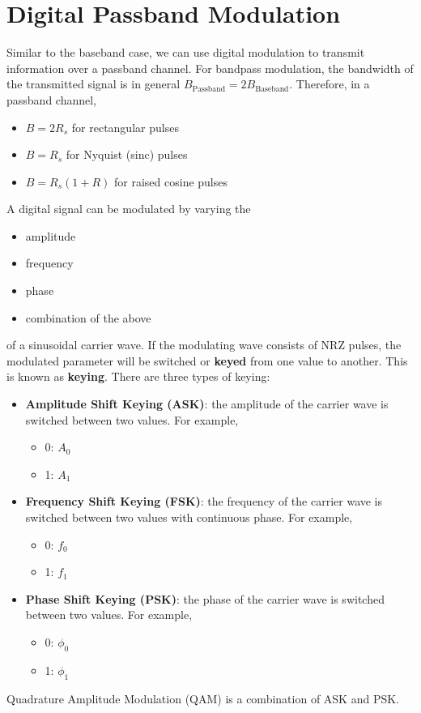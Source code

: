 \documentclass{article}
\begin{document}
\section{Digital Passband Modulation}
Similar to the baseband case, we can use digital modulation to transmit
information over a passband channel. For bandpass modulation, the
bandwidth of the transmitted signal is in general
\(B_{\mathrm{Passband}} = 2B_{\mathrm{Baseband}}\). Therefore, in a
passband channel,
\begin{itemize}
    \item \(B = 2 R_s\) for rectangular pulses
    \item \(B = R_s\) for Nyquist (sinc) pulses
    \item \(B = R_s \left( 1 + R \right)\) for raised cosine pulses
\end{itemize}
A digital signal can be modulated by varying the
\begin{itemize}
    \item amplitude
    \item frequency
    \item phase
    \item combination of the above
\end{itemize}
of a sinusoidal carrier wave. If the modulating wave consists of NRZ
pulses, the modulated parameter will be switched or \textbf{keyed}
from one value to another. This is known as \textbf{keying}. There are
three types of keying:
\begin{itemize}
    \item \textbf{Amplitude Shift Keying (ASK)}: the amplitude of the
          carrier wave is switched between two values. For example,
          \begin{itemize}
              \item 0: \(A_0\)
              \item 1: \(A_1\)
          \end{itemize}
    \item \textbf{Frequency Shift Keying (FSK)}: the frequency of the
          carrier wave is switched between two values with continuous
          phase. For example,
          \begin{itemize}
              \item 0: \(f_0\)
              \item 1: \(f_1\)
          \end{itemize}
    \item \textbf{Phase Shift Keying (PSK)}: the phase of the carrier
          wave is switched between two values. For example,
          \begin{itemize}
              \item 0: \(\phi_0\)
              \item 1: \(\phi_1\)
          \end{itemize}
\end{itemize}
Quadrature Amplitude Modulation (QAM) is a combination of ASK and PSK.
\end{document}
